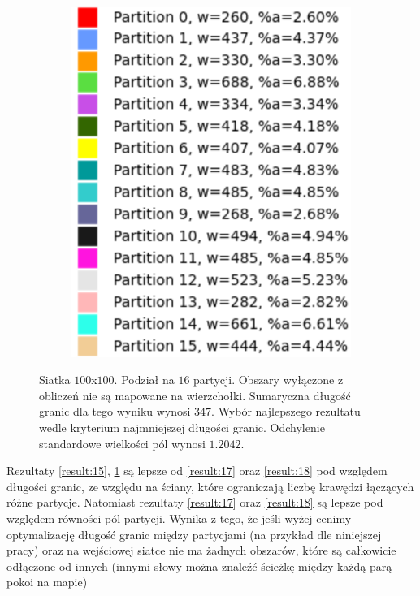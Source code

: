 \begin{figure}[h]
\begin{subfigure}{.33\textwidth}
    \caption[short]{}
\end{subfigure}%
\begin{subfigure}{.33\textwidth}
    \centering
    \includegraphics[width=0.9\linewidth]{images/results/m_k/with/16/results}
    \caption[short]{}
\end{subfigure}
\caption{Siatka $100$x$100$. Podział na $16$ partycji.
Obszary wyłączone z obliczeń nie są mapowane na wierzchołki.
Sumaryczna długość granic dla tego wyniku wynosi $347$.
Wybór najlepszego rezultatu wedle kryterium najmniejszej długości granic.
Odchylenie standardowe wielkości pól wynosi $1.2042$.}
\label{result:16}
\end{figure}
Rezultaty \ref{result:15}, \ref{result:16} są lepsze od \ref{result:17} oraz \ref{result:18} pod względem
długości granic, ze względu na ściany, które ograniczają liczbę krawędzi łączących różne partycje.
Natomiast rezultaty \ref{result:17} oraz \ref{result:18} są lepsze pod względem równości pól partycji.
Wynika z tego, że jeśli wyżej cenimy optymalizację długość granic między partycjami (na przykład dle niniejszej pracy)
oraz na wejściowej siatce nie ma żadnych obszarów, które są całkowicie odłączone od innych
(innymi słowy można znaleźć ścieżkę między każdą parą pokoi na mapie)
